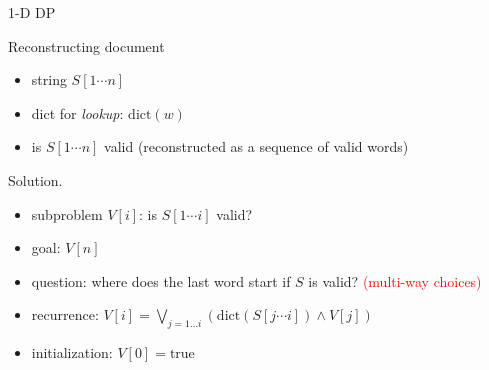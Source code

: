 \begin{frame}{1-D DP}
  \begin{exampleblock}{Reconstructing document }
    \begin{itemize}
      \item string $S[1 \cdots n]$
      \item dict for \emph{lookup}: $\text{dict}(w)$
      \item is $S[1 \cdots n]$ valid (reconstructed as a sequence of valid words)
    \end{itemize}
  \end{exampleblock}

  \begin{block}{Solution.}
    \begin{itemize}
      \item subproblem $V[i]$: is $S[1 \cdots i]$ valid?
      \item goal: $V[n]$
      \item question: where does the last word start if $S$ is valid? {\footnotesize \textcolor{red}{(multi-way choices)}}
      \item recurrence: $V[i] = \bigvee_{j = 1 \ldots i} (\text{dict}(S[j \cdots i]) \land V[j])$
      \item initialization: $V[0] = \text{true}$
    \end{itemize}
  \end{block}
\end{frame}
